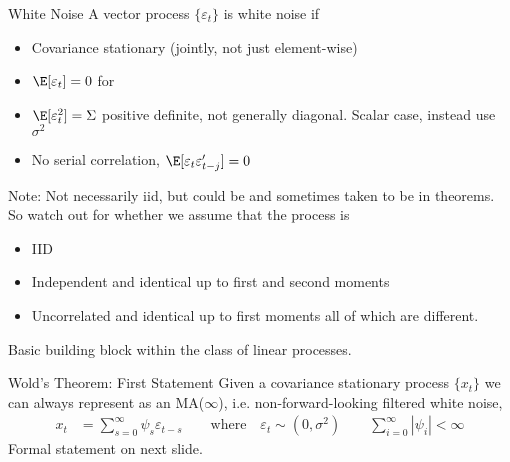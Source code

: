\documentclass[aspectratio=169, handout]{beamer}
\begin{document}

{\footnotesize
\begin{frame}{White Noise}
A vector process $\{\varepsilon_t\}$ is \alert{white noise} if
\begin{itemize}
  \item Covariance stationary (jointly, not just element-wise)
  \item $\E[\varepsilon_t]=0$ for
  \item $\E[\varepsilon_t^2] = \Sigma$ positive definite, not
    generally diagonal.
    Scalar case, instead use $\sigma^2$
  \item No serial correlation, $\E[\varepsilon_t\varepsilon_{t-j}']=0$
\end{itemize}
\pause
Note: Not necessarily iid, but could be and sometimes taken to be in
theorems. So watch out for whether we assume that the process is
\begin{itemize}
  \item IID
  \item Independent and identical up to first and second moments
  \item Uncorrelated and identical up to first moments all of which are
    different.
\end{itemize}
Basic building block within the class of linear processes.
\end{frame}
}



{\footnotesize
\begin{frame}{Wold's Theorem: First Statement}
Given a \alert{covariance stationary} process $\{x_t\}$ we can
always represent as an MA($\infty$), i.e.
non-forward-looking filtered white noise,
\begin{align*}
  x_t
  &=
  \sum_{s=0}^\infty \psi_s\varepsilon_{t-s}
  \qquad\text{where}\quad
  \varepsilon_t
  \sim (0,\sigma^2)
  \qquad
  \sum_{i=0}^\infty
  |\psi_i|
  <\infty
\end{align*}
Formal statement on next slide.
\end{frame}
}
\end{document}
